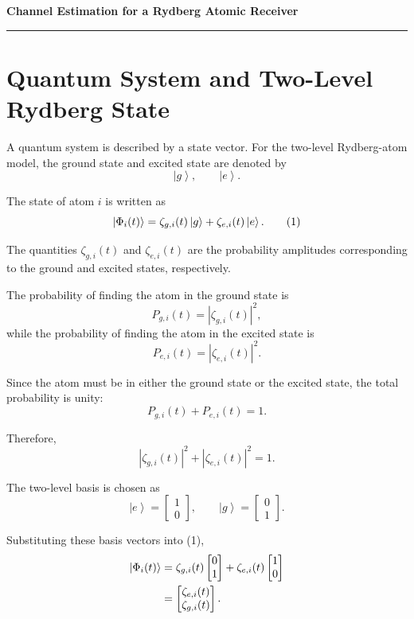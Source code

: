 \documentclass[12pt,a4paper]{article}
\newcommand{\ketg}{\left|g\right\rangle}
\newcommand{\kete}{\left|e\right\rangle}
\begin{document}
\begin{center}
    {\Large\bfseries Channel Estimation for a Rydberg Atomic Receiver}\\[4pt]
\end{center}

\hrule
\vspace{8pt}



\section{Quantum System and Two-Level Rydberg State}

A quantum system is described by a state vector. For the two-level
Rydberg-atom model, the ground state and excited state are denoted
by
\[
\ketg,
\qquad
\kete.
\]

The state of atom \(i\) is written as
\begin{equation}
\ket{\Phi_i(t)}
=
\zeta_{g,i}(t)\ketg
+
\zeta_{e,i}(t)\kete .
\tag{1}
\end{equation}

The quantities
\(\zeta_{g,i}(t)\) and \(\zeta_{e,i}(t)\) are the probability
amplitudes corresponding to the ground and excited states,
respectively.

The probability of finding the atom in the ground state is
\[
P_{g,i}(t)
=
\left|\zeta_{g,i}(t)\right|^2,
\]
while the probability of finding the atom in the excited state is
\[
P_{e,i}(t)
=
\left|\zeta_{e,i}(t)\right|^2.
\]

Since the atom must be in either the ground state or the excited
state, the total probability is unity:
\[
P_{g,i}(t)+P_{e,i}(t)=1.
\]

Therefore,
\[
\boxed{
\left|\zeta_{g,i}(t)\right|^2
+
\left|\zeta_{e,i}(t)\right|^2
=1.
}
\]

The two-level basis is chosen as
\[
\kete
=
\begin{bmatrix}
1\\
0
\end{bmatrix},
\qquad
\ketg
=
\begin{bmatrix}
0\\
1
\end{bmatrix}.
\]

Substituting these basis vectors into (1),
\[
\begin{aligned}
\ket{\Phi_i(t)}
&=
\zeta_{g,i}(t)
\begin{bmatrix}
0\\
1
\end{bmatrix}
+
\zeta_{e,i}(t)
\begin{bmatrix}
1\\
0
\end{bmatrix}\\
&=
\begin{bmatrix}
\zeta_{e,i}(t)\\
\zeta_{g,i}(t)
\end{bmatrix}.
\end{aligned}
\]
\end{document}
